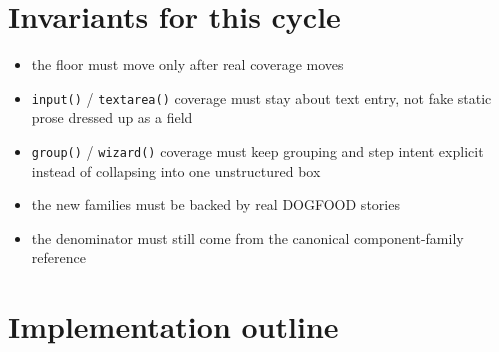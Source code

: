 \section{Invariants for this cycle}\label{record-073-invariants-for-this-cycle}

\begin{itemize}
\tightlist
\item
  the floor must move only after real coverage moves
\item
  \texttt{i\allowbreak{}n\allowbreak{}p\allowbreak{}u\allowbreak{}t\allowbreak{}(\allowbreak{})} / \texttt{t\allowbreak{}e\allowbreak{}x\allowbreak{}t\allowbreak{}a\allowbreak{}r\allowbreak{}e\allowbreak{}a\allowbreak{}(\allowbreak{})} coverage must stay about text entry, not fake static prose dressed up as a field
\item
  \texttt{g\allowbreak{}r\allowbreak{}o\allowbreak{}u\allowbreak{}p\allowbreak{}(\allowbreak{})} / \texttt{w\allowbreak{}i\allowbreak{}z\allowbreak{}a\allowbreak{}r\allowbreak{}d\allowbreak{}(\allowbreak{})} coverage must keep grouping and step intent explicit instead of collapsing into one unstructured box
\item
  the new families must be backed by real DOGFOOD stories
\item
  the denominator must still come from the canonical component-family reference
\end{itemize}

\section{Implementation outline}\label{record-073-implementation-outline}

